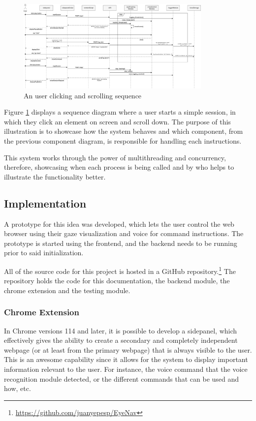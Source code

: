 \begin{figure}[ht]
    \centering
    \includegraphics[width=0.85\textwidth]{images/sequence-diagram.jpg}
    \caption{An user clicking and scrolling sequence}
    \label{fig:sequence-diagram}
\end{figure}

Figure \ref{fig:sequence-diagram} displays a sequence diagram where a user starts a simple session, in which they click an element on screen and scroll down. The purpose of this illustration is to showcase how the system behaves and which component, from the previous component diagram, is responsible for handling each instructions. 

This system works through the power of multithreading and concurrency, therefore, showcasing when each process is being called and by who helps to illustrate the functionality better.



\subsection{Implementation}
A prototype for this idea was developed, which lets the user control the web browser using their gaze visualization and voice for command instructions. The prototype is started using the frontend, and the backend needs to be running prior to said initialization. 

All of the source code for this project is hosted in a GitHub repository.\footnote{\url{https://github.com/juanyepesp/EyeNav}} The repository holds the code for this documentation, the backend module, the chrome extension and the testing module.

\subsubsection{Chrome Extension}
In Chrome versions 114 and later, it is possible to develop a sidepanel, which effectively gives the ability to create a secondary and completely independent webpage (or at least from the primary webpage) that is always visible to the user. This is an awesome capability since it allows for the system to display important information relevant to the user. For instance, the voice command that the voice recognition module detected, or the different commands that can be used and how, etc.

